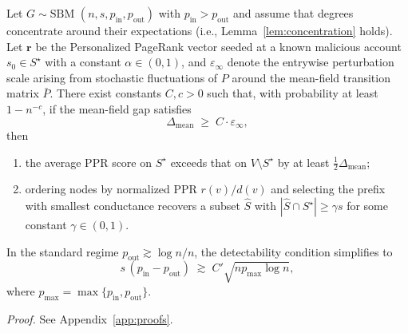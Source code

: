 \begin{theorem}
\label{thm:detectability}
Let $G\sim\mathrm{SBM}$ $(n,s,p_{\mathrm{in}},p_{\mathrm{out}})$ with $p_{\mathrm{in}}>p_{\mathrm{out}}$ and assume that degrees concentrate around their expectations (i.e., Lemma~\ref{lem:concentration} holds). Let $\mathbf{r}$ be the Personalized PageRank vector seeded at a known malicious account $s_0\in S^\star$ with a constant $\alpha\in(0,1)$, and $\varepsilon_{\infty}$ denote the entrywise perturbation scale arising from stochastic fluctuations of $P$ around the mean-field transition matrix $\bar P$. There exist constants $C,c>0$ such that, with probability at least $1-n^{-c}$, if the mean-field gap satisfies
\[
\Delta_{\mathrm{mean}} \;\ge\; C\cdot\varepsilon_{\infty},
\]
then 
\begin{enumerate}
    \item the average PPR score on $S^\star$ exceeds that on $V\setminus S^\star$ by at least $\tfrac{1}{2}\Delta_{\mathrm{mean}}$;
    \item ordering nodes by normalized PPR $r(v)/d(v)$ and selecting the prefix with smallest conductance recovers a subset $\widehat S$ with $|\widehat S\cap S^\star|\ge\gamma s$ for some constant $\gamma\in(0,1)$.
\end{enumerate}
In the standard regime $p_{\mathrm{out}}\gtrsim \log n/n$, the detectability condition simplifies to
\[
s\,(p_{\mathrm{in}}-p_{\mathrm{out}}) \;\gtrsim\; C'\sqrt{n p_{\max}\log n},
\]
where $p_{\max}=\max\{p_{\mathrm{in}},p_{\mathrm{out}}\}$. 
\end{theorem}

\vspace{0.5em}
\noindent\textit{Proof.}
See Appendix~\ref{app:proofs}.

